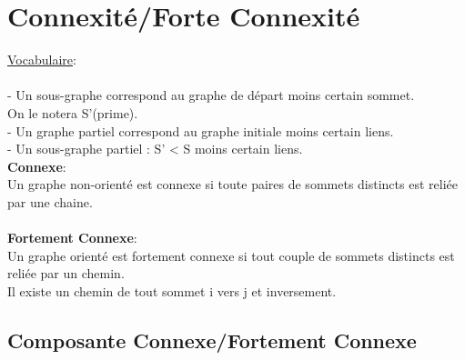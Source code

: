\documentclass[a4paper,12pt,openany]{book}
\begin{document}

\section{Connexité/Forte Connexité}

\underline{Vocabulaire}:\\
\\
- Un sous-graphe correspond au graphe de départ moins certain sommet.\\
On le notera S'(prime).\\
- Un graphe partiel correspond au graphe initiale moins certain liens.\\
- Un sous-graphe partiel : S' < S moins certain liens.\\

\textbf{Connexe}: \\
Un graphe non-orienté est connexe si toute paires de sommets distincts est reliée par une chaine.\\
\\
\textbf{Fortement Connexe}:\\
Un graphe orienté est fortement connexe si tout couple de sommets distincts est reliée par un chemin.\\
Il existe un chemin de tout sommet i vers j et inversement.\\


\subsection{Composante Connexe/Fortement Connexe}
\end{document}
